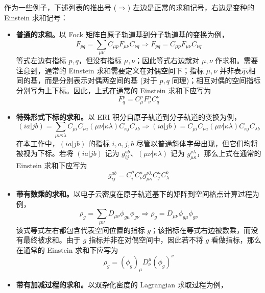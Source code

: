 作为一些例子，下述列表的推出号 ($\Rightarrow$) 左边是正常的求和记号，右边是变种的 Einstein 求和记号：
\begin{itemize}[nosep]
\item \textbf{普通的求和。}以 Fock 矩阵自原子轨道基到分子轨道基的变换为例，
\begin{equation}
    F_{pq} = \sum_{\mu \nu} C_{\mu p} F_{\mu \nu} C_{\nu q}
    \Rightarrow
    F_{pq} = C_{\mu p} F_{\mu \nu} C_{\nu q}
\end{equation}
等式左边有指标 $p, q$，但没有指标 $\mu, \nu$；因此等式右边就对 $\mu, \nu$ 作求和。需要注意到，通常的 Einstein 求和需要定义在对偶空间下；指标 $\mu, \nu$ 并非表示相同的基，而是分别表示对偶两空间的基 (对于 $p, q$ 同理)；相互对偶的空间指标分别写为上下标。因此，上式在通常的 Einstein 求和下应写为
\begin{equation*}
    F^p_q = C^p_\mu F^\mu_\nu C^\nu_q
\end{equation*}
\item \textbf{特殊形式下标的求和。}以 ERI 积分自原子轨道到分子轨道的变换为例，
\begin{equation}
    (ia|jb) = \sum_{\mu \nu \kappa \lambda} C_{\mu i} C_{\nu a} (\mu \nu | \kappa \lambda) C_{\kappa j} C_{\lambda b}
    \Rightarrow
    (ia|jb) = C_{\mu i} C_{\nu a} (\mu \nu | \kappa \lambda) C_{\kappa j} C_{\lambda b}
\end{equation}
在本工作中，$(ia|jb)$ 的指标 $i, a, j, b$ 尽管以普通斜体字母出现，但它们均将被视为下标。若将 $(ia|jb)$ 记为 $g_{ij}^{ab}$、$(\mu \nu | \kappa \lambda)$ 记为 $g_{\mu \kappa}^{\nu \lambda}$，那么上式在通常的 Einstein 求和下应写为
\begin{equation*}
    g_{ij}^{ab} = C_i^\mu C^a_\nu g_{\mu \kappa}^{\nu \lambda} C_j^\kappa C^b_\lambda
\end{equation*}
\item \textbf{带有数乘的求和。}以电子云密度在原子轨道基下的矩阵到空间格点计算过程为例，
\begin{equation}
    \rho_g = \sum_{\mu \nu} D_{\mu \nu} \phi_{g \mu} \phi_{g \nu}
    \Rightarrow
    \rho_g = D_{\mu \nu} \phi_{g \mu} \phi_{g \nu}
\end{equation}
该式等式左右都包含代表空间位置的指标 $g$；该指标在等式右边被数乘，而没有最终被求和。由于 $g$ 指标并非在对偶空间中，因此若不将 $g$ 看做指标，那么在通常的 Einstein 求和下应写为
\begin{equation*}
    \rho_g = (\phi_g)_\mu D^\mu_\nu (\phi_g)^\nu
\end{equation*}
\item \textbf{带有加减过程的求和。}以双杂化密度的 Lagrangian 求取过程为例，

\end{itemize}
